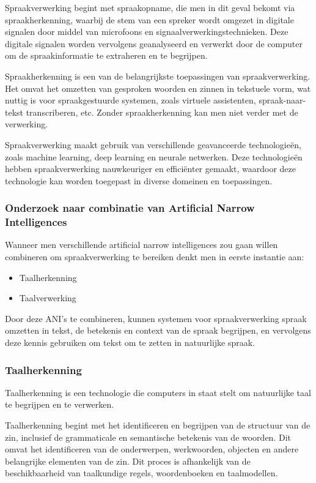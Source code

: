Spraakverwerking begint met spraakopname, die men in dit geval bekomt via spraakherkenning, waarbij de stem van een spreker wordt omgezet in digitale signalen door middel van microfoons en signaalverwerkingstechnieken. Deze digitale signalen worden vervolgens geanalyseerd en verwerkt door de computer om de spraakinformatie te extraheren en te begrijpen.

Spraakherkenning is een van de belangrijkste toepassingen van spraakverwerking. Het omvat het omzetten van gesproken woorden en zinnen in tekstuele vorm, wat nuttig is voor spraakgestuurde systemen, zoals virtuele assistenten, spraak-naar-tekst transcriberen, etc. Zonder spraakherkenning kan men niet verder met de verwerking.

Spraakverwerking maakt gebruik van verschillende geavanceerde technologieën, zoals machine learning, deep learning en neurale netwerken. Deze technologieën hebben spraakverwerking nauwkeuriger en efficiënter gemaakt, waardoor deze technologie kan worden toegepast in diverse domeinen en toepassingen.

\subsubsection{Onderzoek naar combinatie van Artificial Narrow Intelligences}

Wanneer men verschillende artificial narrow intelligences zou gaan willen combineren om spraakverwerking te bereiken denkt men in eerste instantie aan:

\begin{itemize}
    \item Taalherkenning
    \item Taalverwerking
\end{itemize}

Door deze ANI's te combineren, kunnen systemen voor spraakverwerking spraak omzetten in tekst, de betekenis en context van de spraak begrijpen, en vervolgens deze kennis gebruiken om tekst om te zetten in natuurlijke spraak.

\subsubsection{Taalherkenning}

Taalherkenning is een technologie die computers in staat stelt om natuurlijke taal te begrijpen en te verwerken.

Taalherkenning begint met het identificeren en begrijpen van de structuur van de zin, inclusief de grammaticale en semantische betekenis van de woorden. Dit omvat het identificeren van de onderwerpen, werkwoorden, objecten en andere belangrijke elementen van de zin. Dit proces is afhankelijk van de beschikbaarheid van taalkundige regels, woordenboeken en taalmodellen.

